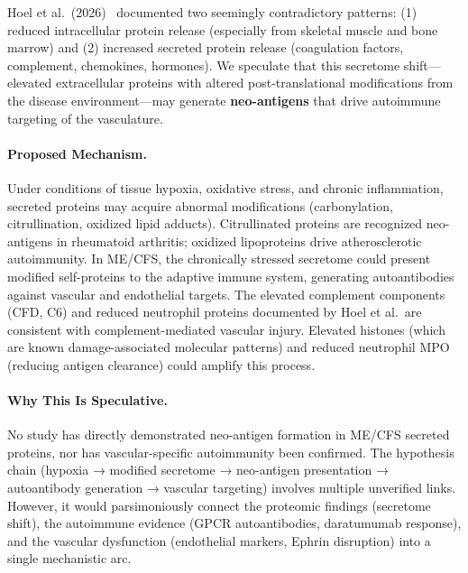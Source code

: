 \begin{speculation}
\label{spec:secretome-autoimmune}

Hoel et al.\ (2026)~\cite{Hoel2026proteome} documented two seemingly contradictory patterns: (1) reduced intracellular protein release (especially from skeletal muscle and bone marrow) and (2) increased secreted protein release (coagulation factors, complement, chemokines, hormones). We speculate that this secretome shift---elevated extracellular proteins with altered post-translational modifications from the disease environment---may generate \textbf{neo-antigens} that drive autoimmune targeting of the vasculature.

\paragraph{Proposed Mechanism.}
Under conditions of tissue hypoxia, oxidative stress, and chronic inflammation, secreted proteins may acquire abnormal modifications (carbonylation, citrullination, oxidized lipid adducts). Citrullinated proteins are recognized neo-antigens in rheumatoid arthritis; oxidized lipoproteins drive atherosclerotic autoimmunity. In ME/CFS, the chronically stressed secretome could present modified self-proteins to the adaptive immune system, generating autoantibodies against vascular and endothelial targets. The elevated complement components (CFD, C6) and reduced neutrophil proteins documented by Hoel et al.\ are consistent with complement-mediated vascular injury. Elevated histones (which are known damage-associated molecular patterns) and reduced neutrophil MPO (reducing antigen clearance) could amplify this process.

\paragraph{Why This Is Speculative.}
No study has directly demonstrated neo-antigen formation in ME/CFS secreted proteins, nor has vascular-specific autoimmunity been confirmed. The hypothesis chain (hypoxia → modified secretome → neo-antigen presentation → autoantibody generation → vascular targeting) involves multiple unverified links. However, it would parsimoniously connect the proteomic findings (secretome shift), the autoimmune evidence (GPCR autoantibodies, daratumumab response), and the vascular dysfunction (endothelial markers, Ephrin disruption) into a single mechanistic arc.


\end{speculation}
